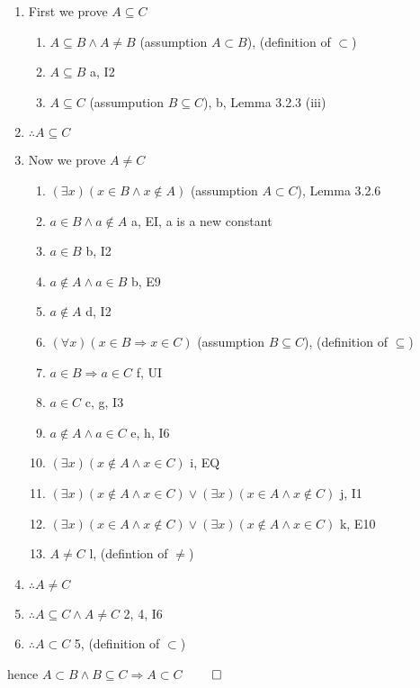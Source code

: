 \documentclass{article}
\begin{document}
			\begin{enumerate}
				\item First we prove $A \subseteq C$
				\begin{enumerate}
					\item $A \subseteq B \land A \neq B$ \hfill (assumption $A \subset B$), (definition of $\subset$)
					\item $A \subseteq B$ \hfill a, I2
					\item $A \subseteq C$ \hfill (assumpution $B \subseteq C$), b, Lemma 3.2.3 (iii)
				\end{enumerate}
				\item $\therefore A \subseteq C$
				\item Now we prove $A \neq C$
				\begin{enumerate}
					\item $(\exists x)(x \in B \land x \notin A)$ \hfill (assumption $A \subset C$), Lemma 3.2.6
					\item $a \in B \land a \notin A$ \hfill a, EI, a is a new constant
					\item $a \in B$ \hfill b, I2
					\item $a \notin A \land a \in B$ \hfill b, E9
					\item $a \notin A$ \hfill d, I2
					\item $(\forall x)(x \in B \Rightarrow x \in C)$ \hfill (assumption $B \subseteq C$), (definition of $\subseteq$)
					\item $a \in B \Rightarrow a \in C$ \hfill f, UI
					\item $a \in C$ \hfill c, g, I3 
					\item $a \notin A \land a \in C$ \hfill e, h, I6
					\item $(\exists x)(x \notin A \land x \in C)$ \hfill i, EQ
					\item $(\exists x)(x \notin A \land x \in C) \lor (\exists x)(x \in A \land x \notin C)$ \hfill j, I1
					\item $(\exists x)(x \in A \land x \notin C) \lor (\exists x)(x \notin A \land x \in C)$ \hfill k, E10
					\item $A \neq C$ \hfill l, (defintion of $\neq$)
				\end{enumerate}
				\item $\therefore A \neq C$
				\item $\therefore A \subseteq C \land A \neq C$ \hfill 2, 4, I6
				\item $\therefore A \subset C$ \hfill 5, (definition of $\subset$)
			\end{enumerate}
			hence $A \subset B \land B \subseteq C \Rightarrow A \subset C$ \hfill $\qed$
\end{document}
